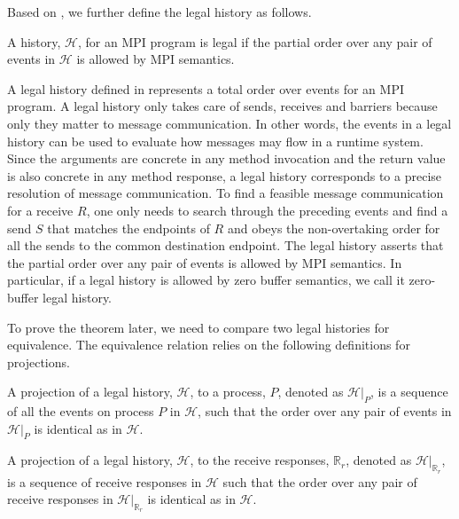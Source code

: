 Based on , we further define the legal history as follows.

\begin{definition}\label{def:legal}
A history, $\mathcal{H}$, for an MPI program is legal if the partial order over any pair of events in $\mathcal{H}$ is allowed by MPI semantics.
\end{definition}

A legal history defined in  represents a total order over events for an MPI program. A legal history only takes care of sends, receives and barriers because only they matter to message communication. In other words, the events in a legal history can be used to evaluate how messages may flow in a runtime system. Since the arguments are concrete in any method invocation and the return value is also concrete in any method response, a legal history corresponds to a precise resolution of message communication. To find a feasible message communication for a receive $R$, one only needs to search through the preceding events and find a send $S$ that matches the endpoints of $R$ and obeys the non-overtaking order for all the sends to the common destination endpoint. The legal history asserts that the partial order over any pair of events is allowed by MPI semantics. In particular, if a legal history is allowed by zero buffer semantics, we call it zero-buffer legal history.

To prove the theorem later, we need to compare two legal histories for equivalence. The equivalence relation relies on the following definitions for projections. 

\begin{definition}\label{def:projection_process}
A projection of a legal history, $\mathcal{H}$, to a process, $P$, denoted as $\mathcal{H} | _P$, is a sequence of all the events on process $P$ in $\mathcal{H}$, such that the order over any pair of events in $\mathcal{H} | _P$ is identical as in $\mathcal{H}$.
\end{definition}

\begin{definition}\label{def:projection_receive}
A projection of a legal history, $\mathcal{H}$, to the receive responses, $\mathbb{R}_r$, denoted as $\mathcal{H} | _{\mathbb{R}_r}$, is a sequence of receive responses in $\mathcal{H}$ such that the order over any pair of receive responses in $\mathcal{H} | _{\mathbb{R}_r}$ is identical as in $\mathcal{H}$.
\end{definition}

